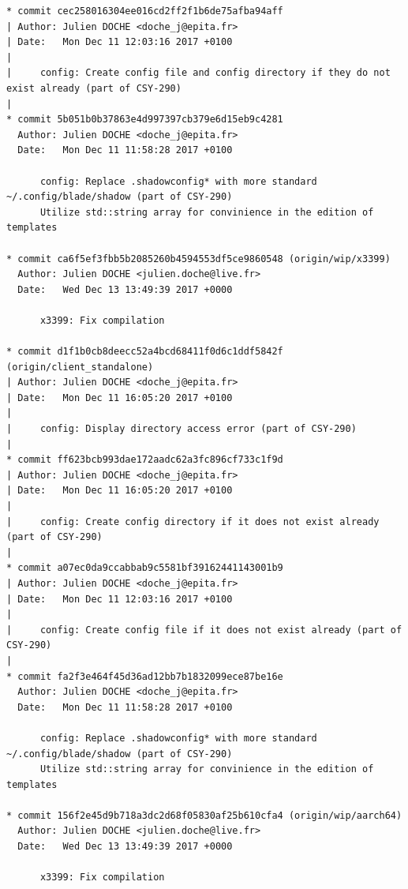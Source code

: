 \noindent
  \begin{minipage}[c]{\textwidth}
    \centering
\begin{lstlisting}
* commit cec258016304ee016cd2ff2f1b6de75afba94aff
| Author: Julien DOCHE <doche_j@epita.fr>
| Date:   Mon Dec 11 12:03:16 2017 +0100
| 
|     config: Create config file and config directory if they do not exist already (part of CSY-290)
| 
* commit 5b051b0b37863e4d997397cb379e6d15eb9c4281
  Author: Julien DOCHE <doche_j@epita.fr>
  Date:   Mon Dec 11 11:58:28 2017 +0100
  
      config: Replace .shadowconfig* with more standard ~/.config/blade/shadow (part of CSY-290)
      Utilize std::string array for convinience in the edition of templates
  
* commit ca6f5ef3fbb5b2085260b4594553df5ce9860548 (origin/wip/x3399)
  Author: Julien DOCHE <julien.doche@live.fr>
  Date:   Wed Dec 13 13:49:39 2017 +0000
  
      x3399: Fix compilation
  
* commit d1f1b0cb8deecc52a4bcd68411f0d6c1ddf5842f (origin/client_standalone)
| Author: Julien DOCHE <doche_j@epita.fr>
| Date:   Mon Dec 11 16:05:20 2017 +0100
| 
|     config: Display directory access error (part of CSY-290)
| 
* commit ff623bcb993dae172aadc62a3fc896cf733c1f9d
| Author: Julien DOCHE <doche_j@epita.fr>
| Date:   Mon Dec 11 16:05:20 2017 +0100
| 
|     config: Create config directory if it does not exist already (part of CSY-290)
| 
* commit a07ec0da9ccabbab9c5581bf39162441143001b9
| Author: Julien DOCHE <doche_j@epita.fr>
| Date:   Mon Dec 11 12:03:16 2017 +0100
| 
|     config: Create config file if it does not exist already (part of CSY-290)
| 
* commit fa2f3e464f45d36ad12bb7b1832099ece87be16e
  Author: Julien DOCHE <doche_j@epita.fr>
  Date:   Mon Dec 11 11:58:28 2017 +0100
  
      config: Replace .shadowconfig* with more standard ~/.config/blade/shadow (part of CSY-290)
      Utilize std::string array for convinience in the edition of templates
  
* commit 156f2e45d9b718a3dc2d68f05830af25b610cfa4 (origin/wip/aarch64)
  Author: Julien DOCHE <julien.doche@live.fr>
  Date:   Wed Dec 13 13:49:39 2017 +0000
  
      x3399: Fix compilation
\end{lstlisting}
  \end{minipage}

\newpage

